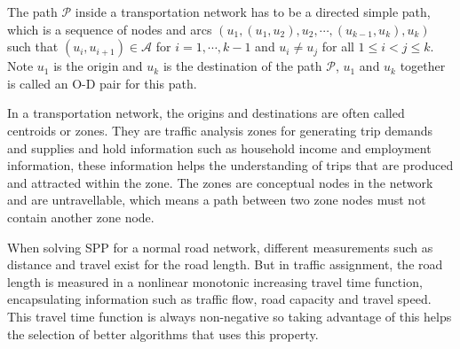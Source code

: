 The path $\mathcal{P}$ inside a transportation network has to be a directed simple path, 
which is a sequence of nodes and arcs $ (u_1, (u_1, u_2), u_2, \cdots , (u_{k-1}, u_k), u_k ) $
such that $ (u_i, u_{i+1}) \in \mathcal{A}$ for $i = 1,\cdots,k-1$ and $u_i \neq u_j$ for all $ 1 \leq i < j \leq k$.
Note $u_1$ is the origin and $u_k$ is the destination of the path $\mathcal{P}$, $u_1$ and $u_k$ together is called an O-D pair for this path.

In a transportation network,
the origins and destinations are often called centroids or zones.
They are traffic analysis zones for generating trip demands and supplies
and hold information such as household income and employment information,
these information helps the understanding of trips that are produced and attracted within the zone.
The zones are conceptual nodes in the network and are untravellable,
which means a path between two zone nodes must not contain another zone node.

When solving SPP for a normal road network,
different measurements such as distance and travel exist for the road length.
But in traffic assignment,
the road length is measured in a nonlinear monotonic increasing travel time function,
encapsulating information such as traffic flow, road capacity and travel speed.
This travel time function is always non-negative so taking advantage of this helps the selection of better algorithms that uses this property.

\begin{comment}
\section{Data Structures}
A Data structure is a way for computers to store, update and manipulate intermediate results.
A good data structure can efficiently speed up the access of the stored data,
which means the performance of solving our shortest path problem does not only depend on the algorithm it self but also the data structure.
In this project,
two data structures are combined to improve the solving speed:
\todo{idea of a data structure is unclear}
\begin{itemize}
\end{itemize}
\end{comment}

